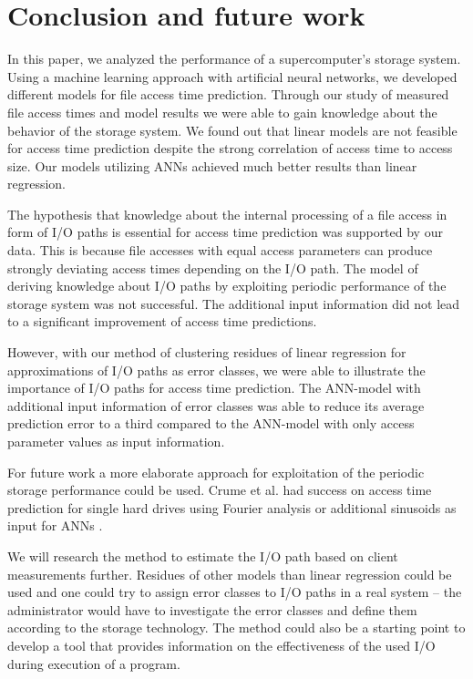 \documentclass{superfri}
\begin{document}
	\section{Conclusion and future work}
	\label{conclusion}
	In this paper, we analyzed the performance of a supercomputer's storage system.
	Using a machine learning approach with artificial neural networks, we developed different models for file access time prediction.
	Through our study of measured file access times and model results we were able to gain knowledge about the behavior of the storage system.
	We found out that linear models are not feasible for access time prediction despite the strong correlation of access time to access size.
	Our models utilizing ANNs achieved much better results than linear regression.
	
	The hypothesis that knowledge about the internal processing of a file access in form of I/O paths is essential for access time prediction was supported by our data.
	This is because file accesses with equal access parameters can produce strongly deviating access times depending on the I/O path. 
	The model of deriving knowledge about I/O paths by exploiting periodic performance of the storage system was not successful.
	The additional input information did not lead to a significant improvement of access time predictions.
	
	However, with our method of clustering residues of linear regression for approximations of I/O paths as error classes, we were able to illustrate the importance of I/O paths for access time prediction. The ANN-model with additional input information of error classes was able to reduce its average prediction error to a third compared to the ANN-model with only access parameter values as input information.\medskip
	
	For future work a more elaborate approach for exploitation of the periodic storage performance could be used. 
	Crume et al. had success on access time prediction for single hard drives using Fourier analysis \cite{Crume:2013:FML:2538542.2538561} or additional sinusoids as input for ANNs \cite{crumelatent}.
	
	We will research the method to estimate the I/O path based on client measurements further.
	Residues of other models than linear regression could be used and one could try to assign error classes to I/O paths in a real system -- the administrator would have to investigate the error classes and define them according to the storage technology.
	The method could also be a starting point to develop a tool that provides information on the effectiveness of the used I/O during execution of a program.
	
	\openaccess
	
	
	
\end{document}
